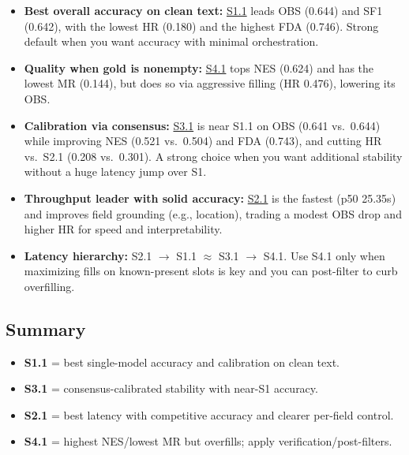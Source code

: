 \begin{itemize}
    \item \textbf{Best overall accuracy on clean text:} \underline{S1.1} leads OBS (0.644) and SF1 (0.642), with the lowest HR (0.180) and the highest FDA (0.746). Strong default when you want accuracy with minimal orchestration.
    \item \textbf{Quality when gold is nonempty:} \underline{S4.1} tops NES (0.624) and has the lowest MR (0.144), but does so via aggressive filling (HR 0.476), lowering its OBS.
    \item \textbf{Calibration via consensus:} \underline{S3.1} is near S1.1 on OBS (0.641 vs.\ 0.644) while improving NES (0.521 vs.\ 0.504) and FDA (0.743), and cutting HR vs.\ S2.1 (0.208 vs.\ 0.301). A strong choice when you want additional stability without a huge latency jump over S1.
    \item \textbf{Throughput leader with solid accuracy:} \underline{S2.1} is the fastest (p50 25.35s) and improves field grounding (e.g., location), trading a modest OBS drop and higher HR for speed and interpretability.
    \item \textbf{Latency hierarchy:} S2.1 \(\rightarrow\) S1.1 \(\approx\) S3.1 \(\rightarrow\) S4.1. Use S4.1 only when maximizing fills on known-present slots is key and you can post-filter to curb overfilling.
\end{itemize}


\subsection*{Summary}

\begin{itemize}
    \item \textbf{S1.1} = best single-model accuracy and calibration on clean text.
    \item \textbf{S3.1} = consensus-calibrated stability with near-S1 accuracy.
    \item \textbf{S2.1} = best latency with competitive accuracy and clearer per-field control.
    \item \textbf{S4.1} = highest NES/lowest MR but overfills; apply verification/post-filters.
\end{itemize}
